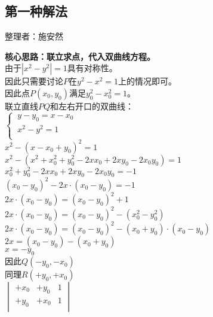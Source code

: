 \documentclass[UTF8]{ctexart}
\begin{document}
\newpage

\subsection{第一种解法}
    \begin{center}
        整理者：施安然
    \end{center}
    \begin{multicols}{2}
        \small
        \textbf{核心思路：联立求点，代入双曲线方程。}\\[5mm]
        由于$\left|x^2-y^2\right|=1$具有对称性。\\[5mm]
        因此只需要讨论$P$在$y^2-x^2=1$上的情况即可。\\[5mm]
        因此点$P(x_0,y_0)$满足$y_0^2-x_0^2=1$。\\[8mm]
        联立直线$PQ$和左右开口的双曲线：\\[5mm]
        \begin{math}
            \begin{cases}
                ~y - y_0 = x - x_0\\[2mm]
                ~x^2 - y^2 = 1\\[1mm]
            \end{cases}
        \end{math}\\[5mm]
        $x^2-(x-x_0+y_0)^2=1$\\[5mm]
        $x^2-(x^2+x_0^2+y_0^2-2xx_0+2xy_0-2x_0y_0)=1$\\[5mm]
        $x_0^2+y_0^2-2xx_0+2xy_0-2x_0y_0=-1$\\[5mm]
        $(x_0-y_0)^2-2x\cdot(x_0-y_0)=-1$\\[5mm]
        $2x\cdot(x_0-y_0)=(x_0-y_0)^2+1$\\[5mm]
        $2x\cdot(x_0-y_0)=(x_0-y_0)^2-(x_0^2-y_0^2)$\\[5mm]
        $2x\cdot(x_0-y_0)=(x_0-y_0)^2-(x_0+y_0)\cdot(x_0-y_0)$\\[5mm]
        $2x=(x_0-y_0)-(x_0+y_0)$\\[5mm]
        $x=-y_0$\\[100mm]
        因此$Q(-y_0, -x_0)$\\[5mm]
        同理$R(+y_0, +x_0)$\\[5mm]
        \begin{math}
            \begin{vmatrix}
                +x_0&+y_0&1\\
                +y_0&+x_0&1\\

\end{vmatrix}
\end{math}
\end{multicols}
\end{document}
